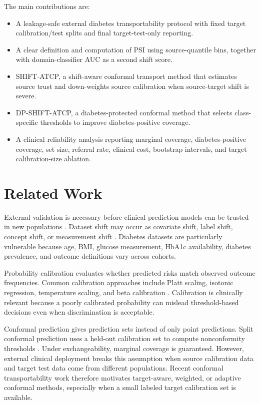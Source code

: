 \documentclass{ieeeaccess}
\begin{document}
The main contributions are:
\begin{itemize}
    \item A leakage-safe external diabetes transportability protocol with fixed target calibration/test splits and final target-test-only reporting.
    \item A clear definition and computation of PSI using source-quantile bins, together with domain-classifier AUC as a second shift score.
    \item SHIFT-ATCP, a shift-aware conformal transport method that estimates source trust and down-weights source calibration when source-target shift is severe.
    \item DP-SHIFT-ATCP, a diabetes-protected conformal method that selects class-specific thresholds to improve diabetes-positive coverage.
    \item A clinical reliability analysis reporting marginal coverage, diabetes-positive coverage, set size, referral rate, clinical cost, bootstrap intervals, and target calibration-size ablation.
\end{itemize}

\section{Related Work}
External validation is necessary before clinical prediction models can be trusted in new populations \cite{tripod}. Dataset shift may occur as covariate shift, label shift, concept shift, or measurement shift \cite{datasetShift}. Diabetes datasets are particularly vulnerable because age, BMI, glucose measurement, HbA1c availability, diabetes prevalence, and outcome definitions vary across cohorts.

Probability calibration evaluates whether predicted risks match observed outcome frequencies. Common calibration approaches include Platt scaling, isotonic regression, temperature scaling, and beta calibration \cite{plattScaling,zadrozny2002,guo2017,kull2017}. Calibration is clinically relevant because a poorly calibrated probability can mislead threshold-based decisions even when discrimination is acceptable.

Conformal prediction gives prediction sets instead of only point predictions. Split conformal prediction uses a held-out calibration set to compute nonconformity thresholds \cite{vovk2005,shafer2008}. Under exchangeability, marginal coverage is guaranteed. However, external clinical deployment breaks this assumption when source calibration data and target test data come from different populations. Recent conformal transportability work therefore motivates target-aware, weighted, or adaptive conformal methods, especially when a small labeled target calibration set is available.
\end{document}
